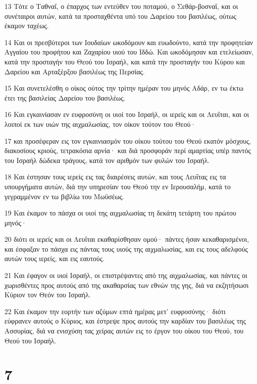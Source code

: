 \par 13 Τότε ο Ταθναΐ, ο έπαρχος των εντεύθεν του ποταμού, ο Σεθάρ-βοσναΐ, και οι συνέταιροι αυτών, κατά τα προσταχθέντα υπό του Δαρείου του βασιλέως, ούτως έκαμον ταχέως.
\par 14 Και οι πρεσβύτεροι των Ιουδαίων ωκοδόμουν και ευωδούντο, κατά την προφητείαν Αγγαίου του προφήτου και Ζαχαρίου υιού του Ιδδώ. Και ωκοδόμησαν και ετελείωσαν, κατά την προσταγήν του Θεού του Ισραήλ, και κατά την προσταγήν του Κύρου και Δαρείου και Αρταξέρξου βασιλέως της Περσίας.
\par 15 Και συνετελέσθη ο οίκος ούτος την τρίτην ημέραν του μηνός Αδάρ, εν τω έκτω έτει της βασιλείας Δαρείου του βασιλέως.
\par 16 Και εγκαινίασαν εν ευφροσύνη οι υιοί του Ισραήλ, οι ιερείς και οι Λευΐται, και οι λοιποί εκ των υιών της αιχμαλωσίας, τον οίκον τούτον του Θεού·
\par 17 και προσέφεραν εις τον εγκαινιασμόν του οίκου τούτου του Θεού εκατόν μόσχους, διακοσίους κριούς, τετρακόσια αρνία· και διά προσφοράν περί αμαρτίας υπέρ παντός του Ισραήλ δώδεκα τράγους, κατά τον αριθμόν των φυλών του Ισραήλ.
\par 18 Και έστησαν τους ιερείς εις τας διαιρέσεις αυτών, και τους Λευΐτας εις τα υπουργήματα αυτών, διά την υπηρεσίαν του Θεού την εν Ιερουσαλήμ, κατά το γεγραμμένον εν τω βιβλίω του Μωϋσέως.
\par 19 Και έκαμον το πάσχα οι υιοί της αιχμαλωσίας τη δεκάτη τετάρτη του πρώτου μηνός·
\par 20 διότι οι ιερείς και οι Λευΐται εκαθαρίσθησαν ομού· πάντες ήσαν κεκαθαρισμένοι, και έσφαξαν το πάσχα εις πάντας τους υιούς της αιχμαλωσίας, και εις τους αδελφούς αυτών τους ιερείς, και εις εαυτούς.
\par 21 Και έφαγον οι υιοί Ισραήλ, οι επιστρέψαντες από της αιχμαλωσίας, και πάντες οι χωρισθέντες προς αυτούς από της ακαθαρσίας των εθνών της γης, διά να εκζητήσωσι Κύριον τον Θεόν του Ισραήλ.
\par 22 Και έκαμον την εορτήν των αζύμων επτά ημέρας μετ' ευφροσύνης· διότι εύφρανεν αυτούς ο Κύριος, και έστρεψε προς αυτούς την καρδίαν του βασιλέως της Ασσυρίας, διά να ενισχύση τας χείρας αυτών εις το έργον του οίκου του Θεού, του Θεού του Ισραήλ.

\chapter{7}

